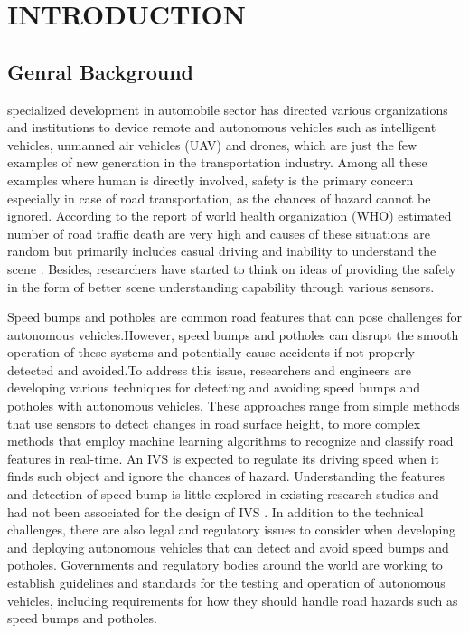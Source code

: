 \graphicspath{{Figures/chapter1}}
\chapter{INTRODUCTION}
\section{Genral Background}
specialized development in automobile sector has directed various organizations and institutions to device remote and autonomous vehicles such as intelligent vehicles, unmanned air vehicles (UAV) and drones, which are just the few examples of new generation in the transportation industry. Among all these examples where human is directly involved, safety is the primary concern especially in case of road transportation, as the chances of hazard cannot be ignored. According to the report of world health organization (WHO) estimated number of road traffic death are very high and causes of these situations are random but primarily includes casual driving and inability to understand the scene \cite{R3}. Besides, researchers have started to think on ideas of providing the safety in the form of better scene understanding capability through various sensors.

\noindent
Speed bumps and potholes are common road features that can pose challenges for autonomous vehicles.However, speed bumps and potholes can disrupt the smooth operation of these systems and potentially cause accidents if not properly detected and avoided.To address this issue, researchers and engineers are developing various techniques for detecting and avoiding speed bumps and potholes with autonomous vehicles. These approaches range from simple methods that use sensors to detect changes in road surface height, to more complex methods that employ machine learning algorithms to recognize and classify road features in real-time.
An IVS is expected to regulate its driving speed when it finds such object and ignore the chances of hazard. Understanding the features and detection of speed bump is little explored in existing research studies and had not been associated for the design of IVS \cite{R2}. In addition to the technical challenges, there are also legal and regulatory issues to consider when developing and deploying autonomous vehicles that can detect and avoid speed bumps and potholes. Governments and regulatory bodies around the world are working to establish guidelines and standards for the testing and operation of autonomous vehicles, including requirements for how they should handle road hazards such as speed bumps and potholes.

